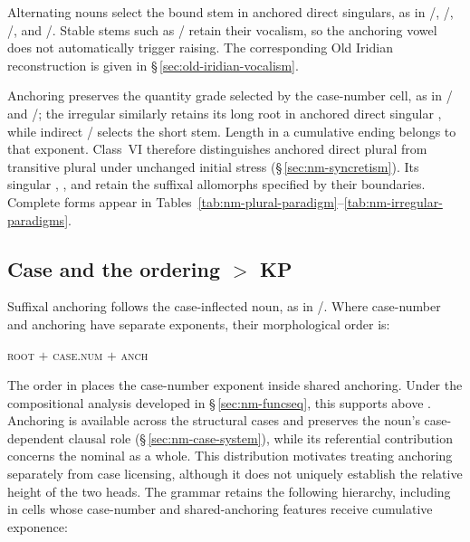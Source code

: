 \label{sec:nm-def-history}
Alternating nouns select the bound stem in anchored direct singulars, as in
/, /,
/, and /. Stable stems such
as / retain their vocalism, so the anchoring vowel does
not automatically trigger raising. The corresponding Old Iridian
reconstruction is given in §\,\ref{sec:old-iridian-vocalism}.

Anchoring preserves the quantity grade selected by the case-number cell, as
in / and /; the irregular
 similarly retains its long root in anchored direct singular
, while indirect / selects the short
stem. Length in a cumulative ending belongs to that exponent. Class~VI
therefore distinguishes anchored direct plural  from
transitive plural  under unchanged initial stress
(§\,\ref{sec:nm-syncretism}). Its singular , ,
and  retain the suffixal allomorphs specified by their
boundaries. Complete forms appear in
Tables~\ref{tab:nm-plural-paradigm}--\ref{tab:nm-irregular-paradigms}.

\subsection{Case and the ordering  $>$ KP}
\label{sec:nm-def-stacking}

Suffixal anchoring follows the case-inflected noun, as in
/. Where case-number and anchoring have separate
exponents, their morphological order is:

\begin{center}
\textsc{root} $+$ \textsc{case.num} $+$ \textsc{anch}
\end{center}

\noindent The order in  places the case-number exponent
inside shared anchoring. Under the compositional analysis developed in
§\,\ref{sec:nm-funcseq}, this supports  above .
Anchoring is available across the structural cases and preserves the noun's
case-dependent clausal role (§\,\ref{sec:nm-case-system}), while its
referential contribution concerns the nominal as a whole. This distribution
motivates treating anchoring separately from case licensing, although it
does not uniquely establish the relative height of the two heads. The
grammar retains the following hierarchy, including in cells whose
case-number and shared-anchoring features receive cumulative exponence:

